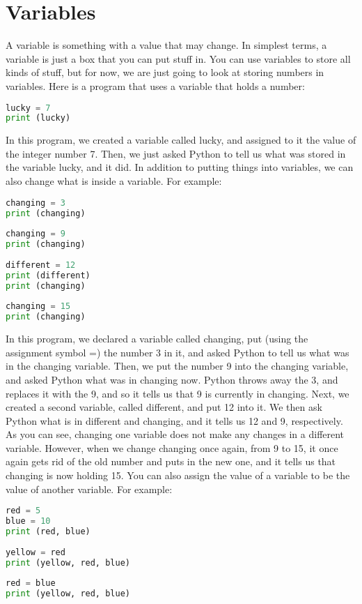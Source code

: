 \section{Variables}
A variable is something with a value that may change. In simplest terms, a
variable is just a box that you can put stuff in. You can use variables to store
all kinds of stuff, but for now, we are just going to look at storing numbers in
variables. Here is a program that uses a variable that holds a number:
\lstset{basicstyle=\scriptsize, numbers=left, captionpos=b, tabsize=4}
\begin{lstlisting}[caption=Variable 1,language={Python},
xleftmargin=15pt, label=lst:variable1]
lucky = 7
print (lucky)
\end{lstlisting}
In this program, we created a variable called lucky, and assigned to it the
value of the integer number 7. Then, we just asked Python to tell us what was
stored in the variable lucky, and it did.  In addition to putting things into
variables, we can also change what is inside a variable. For example:

\lstset{basicstyle=\scriptsize, numbers=left, captionpos=b, tabsize=4}
\begin{lstlisting}[caption=Variable 2,language={Python},
xleftmargin=15pt, label=lst:variable2]
changing = 3
print (changing)
 
changing = 9
print (changing)
 
different = 12
print (different)
print (changing)
 
changing = 15
print (changing)
\end{lstlisting}

In this program, we declared a variable called changing, put (using the
assignment symbol =) the number 3 in it, and asked Python to tell us what was in
the changing variable. Then, we put the number 9 into the changing variable, and
asked Python what was in changing now. Python throws away the 3, and replaces it
with the 9, and so it tells us that 9 is currently in changing. Next, we created
a second variable, called different, and put 12 into it. We then ask Python what
is in different and changing, and it tells us 12 and 9, respectively. As you can
see, changing one variable does not make any changes in a different variable.
However, when we change changing once again, from 9 to 15, it once again gets
rid of the old number and puts in the new one, and it tells us that changing is
now holding 15.  You can also assign the value of a variable to be the value of
another variable. For example:
\lstset{basicstyle=\scriptsize, numbers=left, captionpos=b, tabsize=4}
\begin{lstlisting}[caption=Variable 3,language={Python},
xleftmargin=15pt, label=lst:variable3]
red = 5
blue = 10
print (red, blue)
 
yellow = red
print (yellow, red, blue)
 
red = blue
print (yellow, red, blue)
\end{lstlisting}


